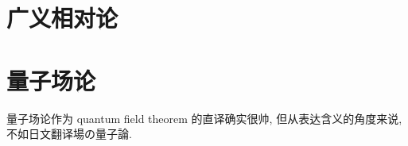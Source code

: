 \documentclass[b5paper,openany]{ctexbook}
\begin{document}
\chapter{广义相对论}




\chapter{量子场论}
量子场论作为 quantum field theorem 的直译确实很帅, 但从表达含义的角度来说, 不如日文翻译場の量子論.


\appendix



\nocite{*}


\end{document}
